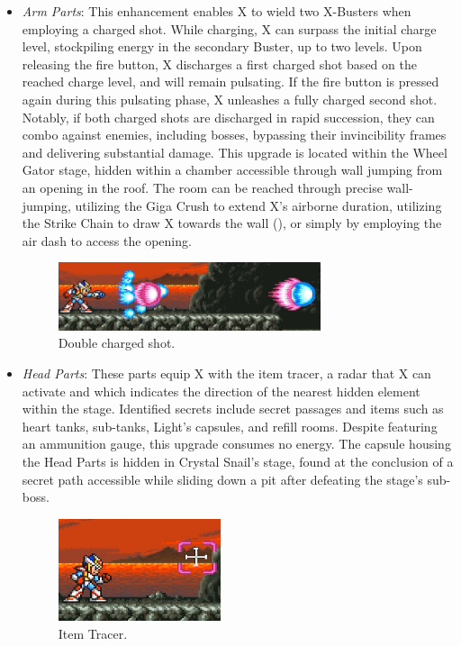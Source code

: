 \begin{itemize}
\item \emph{Arm Parts}: This enhancement enables X to wield two X-Busters when employing a charged shot. While charging, X can surpass the initial charge level, stockpiling energy in the secondary Buster, up to two levels. Upon releasing the fire button, X discharges a first charged shot based on the reached charge level, and will remain pulsating. If the fire button is pressed again during this pulsating phase, X unleashes a fully charged second shot. Notably, if both charged shots are discharged in rapid succession, they can combo against enemies, including bosses, bypassing their invincibility frames and delivering substantial damage. This upgrade is located within the Wheel Gator stage, hidden within a chamber accessible through wall jumping from an opening in the roof. The room can be reached through precise wall-jumping, utilizing the Giga Crush to extend X's airborne duration, utilizing the Strike Chain to draw X towards the wall (), or simply by employing the air dash to access the opening.
	\begin{figure}[htp]
	\centering
	\includegraphics[height=2cm]{figures/X2/weapons/Double_shot.png}
	\caption{Double charged shot.}
\end{figure}

\item \emph{Head Parts}: These parts equip X with the item tracer, a radar that X can activate and which indicates the direction of the nearest hidden element within the stage. Identified secrets include secret passages and items such as heart tanks, sub-tanks, Light's capsules, and refill rooms. Despite featuring an ammunition gauge, this upgrade consumes no energy. The capsule housing the Head Parts is hidden in Crystal Snail's stage, found at the conclusion of a secret path accessible while sliding down a pit after defeating the stage's sub-boss.
\begin{figure}[htp]
	\centering
	\includegraphics[height=3cm]{figures/X2/weapons/Tracer.png}
	\caption{Item Tracer.}
\end{figure}


\end{itemize}
